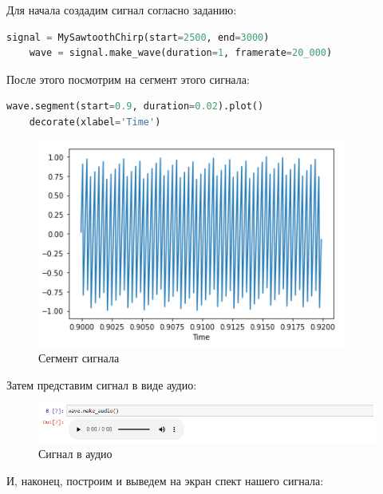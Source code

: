 \documentclass[a4paper]{article}
\begin{document}
            Для начала создадим сигнал согласно заданию:
            
\begin{lstlisting}[language=Python, caption= Создаие согласо задания сигнала]
    signal = MySawtoothChirp(start=2500, end=3000)
    wave = signal.make_wave(duration=1, framerate=20_000)
\end{lstlisting}    
            
            После этого посмотрим на сегмент этого сигнала:
            
\begin{lstlisting}[language=Python, caption= Сегмент сигнала]
    wave.segment(start=0.9, duration=0.02).plot()
    decorate(xlabel='Time')
\end{lstlisting}               
            
            \begin{figure}[H]
                \centering
                \includegraphics{ex_3_segment.png}
                \caption{Сегмент сигнала}
                \label{fig:ex_3_segment}
            \end{figure}
            
            Затем представим сигнал в виде аудио:
            
            \begin{figure}[H]
                \centering
                \includegraphics[width=\textwidth]{ex_3_wave_audio.png}
                \caption{Сигнал в аудио}
                \label{fig:ex_3_wave_audio}
            \end{figure}
            
            И, наконец, построим и выведем на экран спект нашего сигнала:
            
\end{document}
